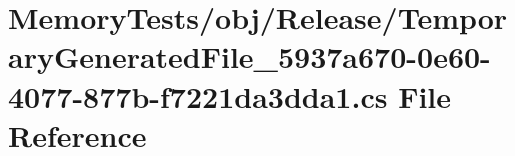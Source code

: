 \hypertarget{_memory_tests_2obj_2_release_2_temporary_generated_file__5937a670-0e60-4077-877b-f7221da3dda1_8cs}{}\section{Memory\+Tests/obj/\+Release/\+Temporary\+Generated\+File\+\_\+5937a670-\/0e60-\/4077-\/877b-\/f7221da3dda1.cs File Reference}
\label{_memory_tests_2obj_2_release_2_temporary_generated_file__5937a670-0e60-4077-877b-f7221da3dda1_8cs}
